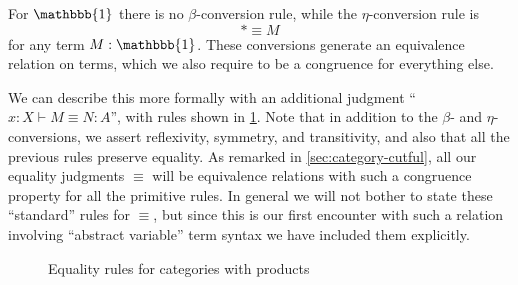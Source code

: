 \documentclass{book}
\let\types\vdash
\def\unit{\mathbbb{1}}%
\def\ttt{\mathord{\ast}}%
\def\pair#1#2{\langle #1,#2\rangle}
\def\pr#1#2#3{\pi_{#1}^{#2,#3}}
\begin{document}
For $\unit$ there is no $\beta$-conversion rule, while the $\eta$-conversion rule is
\begin{equation}\label{eq:eta-unit}
  \ttt \equiv M
\end{equation}
for any term $M:\unit$.
These conversions generate an equivalence relation on terms, which we also require to be a congruence for everything else.

We can describe this more formally with an additional judgment ``$x:X\types M\equiv N :A$'', with rules shown in  \cref{fig:catprod-equality}.
Note that in addition to the $\beta$- and $\eta$-conversions, we assert reflexivity, symmetry, and transitivity, and also that all the previous rules preserve equality.
As remarked in \cref{sec:category-cutful}, all our equality judgments $\equiv$ will be equivalence relations with such a congruence property for all the primitive rules.
In general we will not bother to state these ``standard'' rules for $\equiv$, but since this is our first encounter with such a relation involving ``abstract variable'' term syntax we have included them explicitly.

\begin{figure}
  \centering
  \caption{Equality rules for categories with products}
  \label{fig:catprod-equality}
\end{figure}
\end{document}
